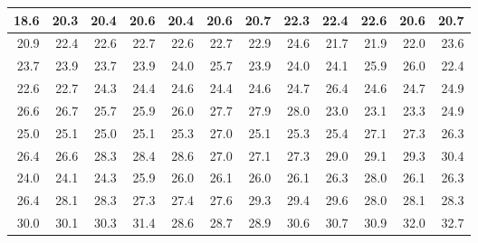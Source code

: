 \documentclass[
]{book}
\begin{document}
\begin{tabular}{r|r|r|r|r|r|r|r|r|r|r|r}
\hline
18.6 & 20.3 & 20.4 & 20.6 & 20.4 & 20.6 & 20.7 & 22.3 & 22.4 & 22.6 & 20.6 & 20.7\\
\hline
20.9 & 22.4 & 22.6 & 22.7 & 22.6 & 22.7 & 22.9 & 24.6 & 21.7 & 21.9 & 22.0 & 23.6\\
\hline
23.7 & 23.9 & 23.7 & 23.9 & 24.0 & 25.7 & 23.9 & 24.0 & 24.1 & 25.9 & 26.0 & 22.4\\
\hline
22.6 & 22.7 & 24.3 & 24.4 & 24.6 & 24.4 & 24.6 & 24.7 & 26.4 & 24.6 & 24.7 & 24.9\\
\hline
26.6 & 26.7 & 25.7 & 25.9 & 26.0 & 27.7 & 27.9 & 28.0 & 23.0 & 23.1 & 23.3 & 24.9\\
\hline
25.0 & 25.1 & 25.0 & 25.1 & 25.3 & 27.0 & 25.1 & 25.3 & 25.4 & 27.1 & 27.3 & 26.3\\
\hline
26.4 & 26.6 & 28.3 & 28.4 & 28.6 & 27.0 & 27.1 & 27.3 & 29.0 & 29.1 & 29.3 & 30.4\\
\hline
24.0 & 24.1 & 24.3 & 25.9 & 26.0 & 26.1 & 26.0 & 26.1 & 26.3 & 28.0 & 26.1 & 26.3\\
\hline
26.4 & 28.1 & 28.3 & 27.3 & 27.4 & 27.6 & 29.3 & 29.4 & 29.6 & 28.0 & 28.1 & 28.3\\
\hline
30.0 & 30.1 & 30.3 & 31.4 & 28.6 & 28.7 & 28.9 & 30.6 & 30.7 & 30.9 & 32.0 & 32.7\\
\hline
\end{tabular}
\end{document}
